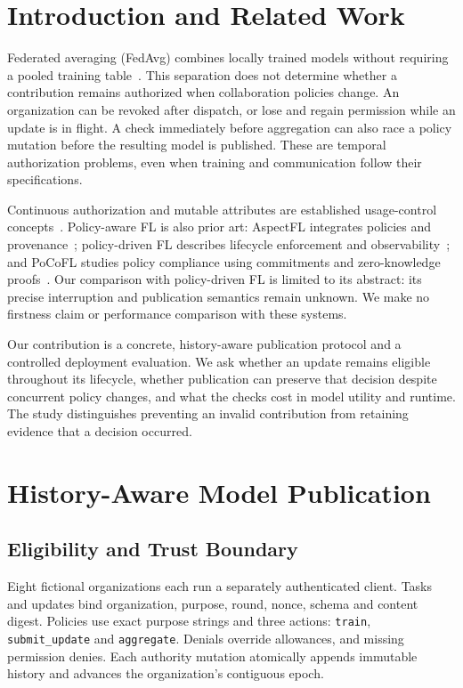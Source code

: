 \documentclass[conference,letterpaper]{IEEEtran}
\begin{document}
\section{Introduction and Related Work}
Federated averaging (FedAvg) combines locally trained models without requiring a pooled training table~\cite{fedavg}. This separation does not determine whether a contribution remains authorized when collaboration policies change. An organization can be revoked after dispatch, or lose and regain permission while an update is in flight. A check immediately before aggregation can also race a policy mutation before the resulting model is published. These are temporal authorization problems, even when training and communication follow their specifications.

Continuous authorization and mutable attributes are established usage-control concepts~\cite{ucon}. Policy-aware FL is also prior art: AspectFL integrates policies and provenance~\cite{aspectfl}; policy-driven FL describes lifecycle enforcement and observability~\cite{pdfl}; and PoCoFL studies policy compliance using commitments and zero-knowledge proofs~\cite{pocofl}. Our comparison with policy-driven FL is limited to its abstract: its precise interruption and publication semantics remain unknown. We make no firstness claim or performance comparison with these systems.

Our contribution is a concrete, history-aware publication protocol and a controlled deployment evaluation. We ask whether an update remains eligible throughout its lifecycle, whether publication can preserve that decision despite concurrent policy changes, and what the checks cost in model utility and runtime. The study distinguishes preventing an invalid contribution from retaining evidence that a decision occurred.

\section{History-Aware Model Publication}
\subsection{Eligibility and Trust Boundary}
Eight fictional organizations each run a separately authenticated client. Tasks and updates bind organization, purpose, round, nonce, schema and content digest. Policies use exact purpose strings and three actions: \texttt{train}, \texttt{submit\_update} and \texttt{aggregate}. Denials override allowances, and missing permission denies. Each authority mutation atomically appends immutable history and advances the organization's contiguous epoch.
\end{document}
